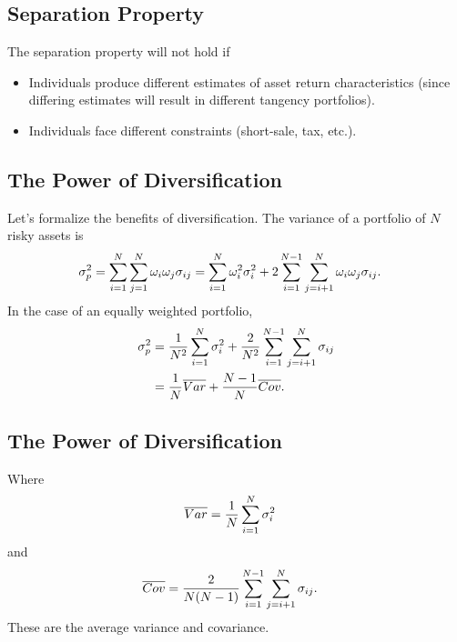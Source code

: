 \documentclass[letterpaper,10pt,english]{sphinxmanual}
\begin{document}
\subsection{Separation Property}
\label{multiAssetOpt:id9}
The separation property will not hold if
\begin{itemize}
\item {} 
Individuals produce different estimates of asset return
characteristics (since differing estimates will result in different
tangency portfolios).

\end{itemize}
\begin{itemize}
\item {} 
Individuals face different constraints (short-sale, tax, etc.).

\end{itemize}


\subsection{The Power of Diversification}
\label{multiAssetOpt:the-power-of-diversification}
Let's formalize the benefits of diversification.  The variance of a
portfolio of $N$ risky assets is
\begin{gather}
\begin{split}\sigma^2_p & = \sum_{i=1}^N \sum_{j=1}^N \omega_i \omega_j
\sigma_{ij} = \sum_{i=1}^N \omega^2_i \sigma^2_i + 2
\sum_{i=1}^{N-1} \sum_{j=i+1}^N \omega_i \omega_j \sigma_{ij}.\end{split}\notag
\end{gather}
In the case of an equally weighted portfolio,
\begin{gather}
\begin{split}\sigma^2_p & = \frac{1}{N^2} \sum_{i=1}^N \sigma^2_i
+ \frac{2}{N^2} \sum_{i=1}^{N-1} \sum_{j=i+1}^N \sigma_{ij} \\
& = \frac{1}{N} \overline{Var} + \frac{N-1}{N}
\overline{Cov}.\end{split}\notag
\end{gather}

\subsection{The Power of Diversification}
\label{multiAssetOpt:id10}
Where
\begin{gather}
\begin{split}\overline{Var} & = \frac{1}{N} \sum_{i=1}^N \sigma^2_i\end{split}\notag
\end{gather}
and
\begin{gather}
\begin{split}\overline{Cov} & = \frac{2}{N(N-1)} \sum_{i=1}^{N-1}
\sum_{j=i+1}^N \sigma_{ij}.\end{split}\notag
\end{gather}
These are the average variance and covariance.
\end{document}
